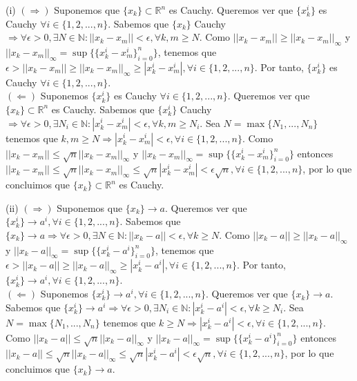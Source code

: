 \begin{dem}(i)
    $(\Rightarrow)$ Suponemos que $\{x_k\}\subset\mathbb{R}^n$ es Cauchy. Queremos ver que  $\{x_k^i\}$ es Cauchy $\forall i\in\{1,2,...,n\}$. Sabemos que $\{x_k\}$ Cauchy $\Rightarrow \forall \epsilon > 0, \exists N\in\mathbb{N}: ||x_k - x_m||<\epsilon, \forall k,m\geq N$. Como $||x_k - x_m|| \geq ||x_k - x_m||_{\infty}$ y $||x_k - x_m||_{\infty} = \sup\{ \{x_k^i - x_m^i\}_{i=0}^n \} $, tenemos que  $\epsilon > ||x_k - x_m|| \geq ||x_k - x_m||_{\infty} \geq |x_k^i - x_m^i|, \forall i \in \{1,2,...,n\}$. Por tanto,  $\{x_k^i\}$ es Cauchy $\forall i\in\{1,2,...,n\}$.\\
    
    $(\Leftarrow)$ Suponemos $\{x_k^i\}$ es Cauchy $\forall i\in\{1,2,...,n\}$. Queremos ver que $\{x_k\}\subset\mathbb{R}^n$ es Cauchy. Sabemos que $\{x_k^i\}$ Cauchy $\Rightarrow \forall \epsilon > 0, \exists N_i\in\mathbb{N}: |x_k^i - x_m^i|<\epsilon, \forall k,m\geq N_i$. Sea $N = \max\{N_1,...,N_n\}$ tenemos que $k,m\geq N \Rightarrow |x_k^i - x_m^i|<\epsilon, \forall i\in\{1,2,...,n\}$. Como $||x_k - x_m|| \leq \sqrt{n}||x_k - x_m||_{\infty}$ y $||x_k - x_m||_{\infty} = \sup\{ \{x_k^i - x_m^i\}_{i=0}^n \}$ entonces $ ||x_k - x_m|| \leq \sqrt{n}||x_k - x_m||_{\infty} \leq \sqrt{n}|x_k^i - x_m^i| < \epsilon\sqrt{n}, \forall i \in \{1,2,...,n\}$, por lo que concluimos que $\{x_k\}\subset\mathbb{R}^n$ es Cauchy.
\end{dem}
\begin{dem}(ii)
    $(\Rightarrow)$ Suponemos que $\{x_k\}\rightarrow a$. Queremos ver que  $\{x_k^i\} \rightarrow a^i,\forall i\in\{1,2,...,n\}$. Sabemos que $\{x_k\}\rightarrow a \Rightarrow \forall \epsilon > 0, \exists N\in\mathbb{N}: ||x_k - a||<\epsilon, \forall k\geq N$. Como $||x_k - a|| \geq ||x_k - a||_{\infty}$ y $||x_k - a||_{\infty} = \sup\{ \{x_k^i - a^i\}_{i=0}^n \} $, tenemos que $\epsilon > ||x_k - a|| \geq ||x_k - a||_{\infty} \geq |x_k^i - a^i|, \forall i \in \{1,2,...,n\}$. Por tanto, $\{x_k^i\}\rightarrow a^i,  \forall i\in\{1,2,...,n\}$.\\
    
    $(\Leftarrow)$ Suponemos $\{x_k^i\} \rightarrow a^i,\forall i\in\{1,2,...,n\}$. Queremos ver que $\{x_k\}\rightarrow a$. Sabemos que $\{x_k^i\} \rightarrow a^i \Rightarrow \forall \epsilon > 0, \exists N_i\in\mathbb{N}: |x_k^i - a^i|<\epsilon, \forall k\geq N_i$. Sea $N = \max\{N_1,...,N_n\}$ tenemos que $k\geq N \Rightarrow |x_k^i - a^i|<\epsilon, \forall i\in\{1,2,...,n\}$. Como $||x_k - a|| \leq \sqrt{n}||x_k - a||_{\infty}$ y $||x_k - a||_{\infty} = \sup\{ \{x_k^i - a^i\}_{i=0}^n \}$ entonces $ ||x_k - a|| \leq \sqrt{n}||x_k - a||_{\infty} \leq \sqrt{n}|x_k^i - a^i| < \epsilon\sqrt{n}, \forall i \in \{1,2,...,n\}$, por lo que concluimos que $\{x_k\}\rightarrow a$.
\end{dem}

